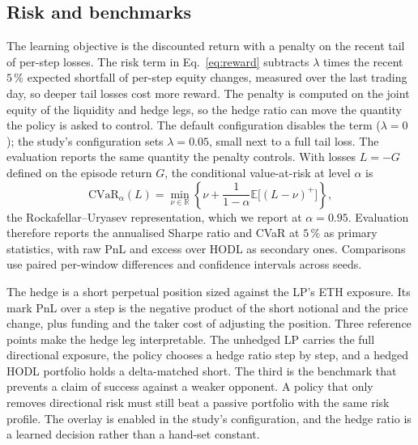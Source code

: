 \subsection{Risk and benchmarks}

The learning objective is the discounted return with a penalty on the recent
tail of per-step losses. The risk term in Eq.~\eqref{eq:reward} subtracts
$\lambda$ times the recent $5\,\%$ expected shortfall of per-step equity
changes, measured over the last trading day, so deeper tail losses cost more
reward. The penalty is computed on the joint equity of the liquidity and
hedge legs, so the hedge ratio can move the quantity the policy is asked to
control. The default configuration disables the term ($\lambda=0$); the
study's configuration sets $\lambda=0.05$, small next to a full tail loss.
The evaluation reports the same quantity the penalty controls. With losses
$L=-G$ defined on the episode return $G$, the conditional value-at-risk at
level $\alpha$ is
\begin{equation}
\mathrm{CVaR}_\alpha(L) = \min_{\nu\in\mathbb{R}}
\left\{\nu+\frac{1}{1-\alpha}\mathbb{E}\big[(L-\nu)^+\big]\right\},
\label{eq:cvar}
\end{equation}
the Rockafellar--Uryasev representation\cite{rockafellar2000cvar}, which we
report at $\alpha=0.95$. Evaluation therefore reports the annualised Sharpe
ratio and CVaR at $5\,\%$ as primary statistics, with raw PnL and excess over
HODL as secondary ones. Comparisons use paired per-window differences and
confidence intervals across seeds.

The hedge is a short perpetual position sized against the LP's ETH exposure.
Its mark PnL over a step is the negative product of the short notional and the
price change, plus funding and the taker cost of adjusting the position. Three
reference points make the hedge leg interpretable. The unhedged LP carries the
full directional exposure, the policy chooses a hedge ratio step by step, and
a hedged HODL portfolio holds a delta-matched short. The third is the
benchmark that prevents a claim of success against a weaker opponent. A policy
that only removes directional risk must still beat a passive portfolio with
the same risk profile. The overlay is enabled in the study's configuration,
and the hedge ratio is a learned decision rather than a hand-set constant.
